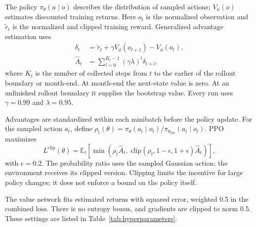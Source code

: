 \documentclass{UNCC-thesis}
\begin{document}
The policy \(\pi_\theta(a\mid o)\) describes the distribution of sampled actions;
\(V_\phi(o)\) estimates discounted training returns. Here \(o_t\) is the
normalized observation and \(\widetilde r_t\) is the normalized and clipped
training reward. Generalized advantage estimation uses
\begin{align}
  \delta_t
  &=\widetilde r_t+\gamma V_\phi(o_{t+1})-V_\phi(o_t),
  \label{eq:td-error}\\
  \hat A_t
  &=\sum_{l=0}^{K_t-1}(\gamma\lambda)^l\delta_{t+l},
  \label{eq:gae}
\end{align}
where \(K_t\) is the number of collected steps from \(t\) to the earlier of
the rollout boundary or month-end. At month-end the next-state value is
zero. At an unfinished rollout boundary it supplies the bootstrap value.
Every run uses \(\gamma=0.99\) and \(\lambda=0.95\).

Advantages are standardized within each minibatch before the policy update.
For the sampled action \(a_t\), define
\(\rho_t(\theta)=\pi_\theta(a_t\mid o_t)/
\pi_{\theta_{\mathrm{old}}}(a_t\mid o_t)\). PPO maximizes
\begin{equation}
  L^{\mathrm{clip}}(\theta)
  =\mathbb E_t\!\left[
    \min\!\left(
      \rho_t\hat A_t,\;
      \mathrm{clip}(\rho_t,1-\epsilon,1+\epsilon)\hat A_t
    \right)
  \right],
  \label{eq:ppo-clip}
\end{equation}
with \(\epsilon=0.2\). The probability ratio uses the sampled Gaussian
action; the environment receives its clipped version. Clipping limits the
incentive for large policy changes; it does not enforce a bound on the
policy itself.

The value network fits estimated returns with squared error, weighted 0.5
in the combined loss. There is no entropy bonus, and gradients are clipped
to norm 0.5. These settings are listed in Table~\ref{tab:hyperparameters}.
\end{document}
